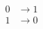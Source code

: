 \documentclass[preview]{standalone}
\begin{document}
\begin{align*}
0 &\longrightarrow 1 \\ 1 &\longrightarrow 0
\end{align*}
\end{document}
